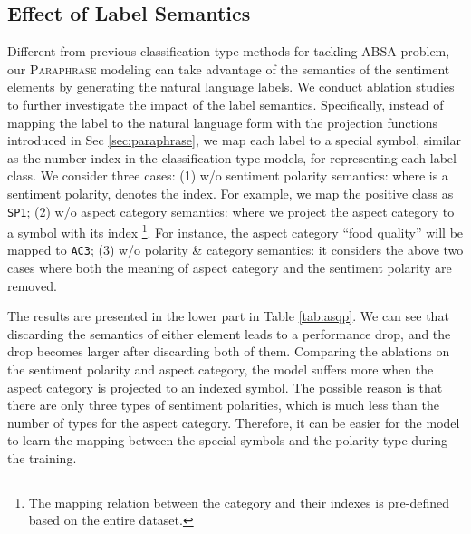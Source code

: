 \documentclass[11pt]{article}
\begin{document}
\subsection{Effect of Label Semantics}
Different from previous classification-type methods for tackling ABSA problem, our \textsc{Paraphrase} modeling can take advantage of the semantics of the sentiment elements by generating the natural language labels. We conduct ablation studies to further investigate the impact of the label semantics. 
Specifically, instead of mapping the label to the natural language form with the projection functions introduced in Sec \ref{sec:paraphrase}, we map each label to a special symbol, similar as the number index in the classification-type models, for representing each label class. 
We consider three cases: (1) w/o sentiment polarity semantics:  where  is a sentiment polarity,  denotes the index. For example, we map the positive class as \verb|SP1|;
(2) w/o aspect category semantics:  where we project the aspect category  to a symbol with its index \footnote{The mapping relation between the category and their indexes is pre-defined based on the entire dataset.}. For instance, the aspect category ``food quality'' will be mapped to \verb|AC3|;
(3) w/o polarity \& category semantics: it considers the above two cases where both the meaning of aspect category and the sentiment polarity are removed. 

The results are presented in the lower part in Table \ref{tab:asqp}. We can see that discarding the semantics of either element leads to a performance drop, and the drop becomes larger after discarding both of them.
Comparing the ablations on the sentiment polarity and aspect category, the model suffers more when the aspect category is projected to an indexed symbol. The possible reason is that there are only three types of sentiment polarities, which is much less than the number of types for the aspect category. Therefore, it can be easier for the model to learn the mapping between the special symbols and the polarity type during the training.
\end{document}
